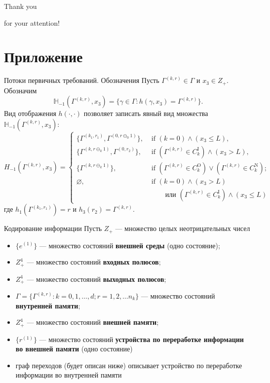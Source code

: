 \documentclass[10pt]{beamer}
\newcommand{\backupbegin}{
   \newcounter{framenumberappendix}
   \setcounter{framenumberappendix}{\value{framenumber}}
}
\begin{document}
\begin{frame}
\Huge{\centerline{\color{blue} Thank you }
\centerline{\color{blue}
for your attention!}}
\end{frame}

\appendix
\section{Приложение}
\backupbegin

\begin{frame}[allowframebreaks]{Потоки первичных требований. Обозначения}
Пусть $\Gamma^{(k,r)}\in \Gamma$ и $x_3 \in Z_+$. Обозначим 
$$
{\mathbb H}_{-1}(\Gamma^{(k,r)}, x_3) = \{\gamma \in \Gamma \colon h(\gamma, x_3) = \Gamma^{(k,r)}\}.
$$
Вид отображения $h(\cdot,\cdot)$ позволяет записать явный вид множества ${\mathbb H}_{-1}(\Gamma^{(k,r)}, x_3)$:
\begin{equation*}
H_{-1}(\Gamma^{(k,r)}, x_3) = 
\begin{cases}
\bigl\{\Gamma^{(k_1,r_1)}, \Gamma^{(0,r\ominus_0 1)}\bigr\},&  \text{ if  $(k=0) \wedge (x_3 \leqslant L)$,}\\
\bigl\{\Gamma^{(k,r\ominus_k 1)}, \Gamma^{(0,r_2)}\bigr\},&  \text{ if  $(\Gamma^{(k,r)}\in C_k^{\mathrm{I}})
  \wedge (x_3>L)$,}\\ 
\bigl\{\Gamma^{(k,r\ominus_k 1)}\bigr\},&  \text{ if  $(\Gamma^{(k,r)}\in C_k^{\mathrm{O}}) \vee (\Gamma^{(k,r)}\in C_k^{\mathrm{N}})$;}\\
\varnothing,&  \text{ if  $(k = 0)\wedge  (x_3>L)$}\\
 & \qquad \text{ или $(\Gamma^{(k,r)}\in C_k^{\mathrm{I}}) \wedge (x_3\leqslant L)$}
\end{cases}
\end{equation*}
где $h_1(\Gamma^{(k_1,r_1)})=r$ и $h_3(r_2)=\Gamma^{(k,r)}$.
\framebreak

\end{frame}

\begin{frame}{Кодирование информации}
Пусть $Z_+$ --- множество целых неотрицательных чисел
  \begin{itemize}
  \item $\{e^{(1)}\}$ --- множество состояний \textbf{внешней среды} (одно состояние);
  \item $Z^4_+$ --- множество состояний \textbf{входных полюсов};
  \item $Z^4_+$ --- множество состояний \textbf{выходных полюсов};
 \item $\Gamma=\{\Gamma^{(k,r)} \colon k=0,1,\ldots,d; r=1,2,\ldots n_k\}$ --- множество состояний \textbf{внутренней памяти};
   \item $Z^4_+$ --- множество состояний \textbf{внешней памяти};
   \item $\{r^{(1)}\}$ --- множество состояний \textbf{устройства по переработке информации во внешней памяти} (одно состояние)
   \item граф переходов (будет описан ниже) описывает устройство по переработке информации во внутренней памяти
   \end{itemize}
\end{frame}
\end{document}
